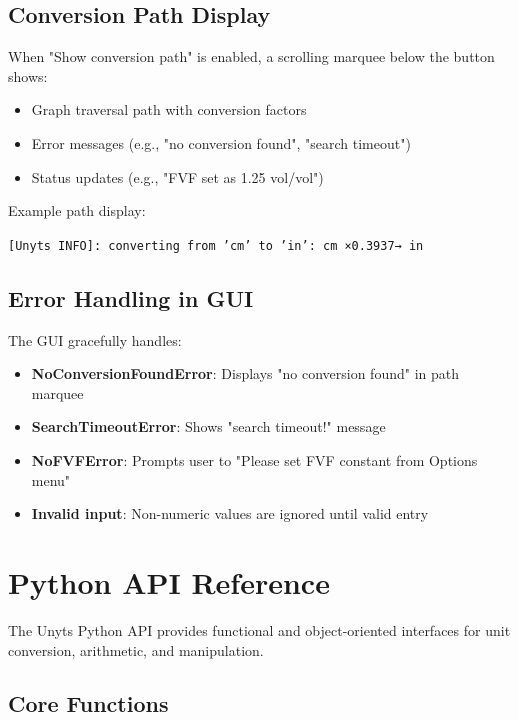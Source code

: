 \documentclass[11pt,a4paper]{report}
\begin{document}
\section{Conversion Path Display}

When "Show conversion path" is enabled, a scrolling marquee below the button shows:

\begin{itemize}
\item Graph traversal path with conversion factors
\item Error messages (e.g., "no conversion found", "search timeout")
\item Status updates (e.g., "FVF set as 1.25 vol/vol")
\end{itemize}

Example path display:
\begin{center}
\texttt{[Unyts INFO]: converting from 'cm' to 'in': cm ×0.3937→ in}
\end{center}

\section{Error Handling in GUI}

The GUI gracefully handles:

\begin{itemize}
\item \textbf{NoConversionFoundError}: Displays "no conversion found" in path marquee
\item \textbf{SearchTimeoutError}: Shows "search timeout!" message
\item \textbf{NoFVFError}: Prompts user to "Please set FVF constant from Options menu"
\item \textbf{Invalid input}: Non-numeric values are ignored until valid entry
\end{itemize}


\chapter{Python API Reference}

The Unyts Python API provides functional and object-oriented interfaces for unit conversion, arithmetic, and manipulation.

\section{Core Functions}
\end{document}
